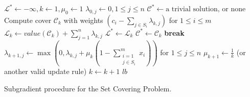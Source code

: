 \begin{enumerate}
    \begin{algorithm}[h]
    \begin{algorithmic}[1]
    \STATE $\mathcal{L}^\ast \gets -\infty, k \gets 1, \mu_0 \gets 1$
    \STATE $\lambda_{0,j} \gets 0, 1 \le j \le n$
    \STATE $\mathcal{C}^\ast \gets \text{a trivial solution, or none}$
        \STATE Compute cover $\mathcal{C}_k$ with weights $\left(c_i - \sum_{j \in S_i} \lambda_{k,j}\right)$ for $1 \le i \le m$
        \STATE $\mathcal{L}_k \gets value\left(\mathcal{C}_k\right) + \sum_{j=1}^n \lambda_{k,j}$
            \STATE $\mathcal{L}^\ast \gets \mathcal{L}_k$
        \ENDIF
            \STATE $\mathcal{C}^\ast \gets \mathcal{C}_k$
        \ENDIF
            \STATE \textbf{break}
        \ENDIF
        \STATE $\lambda_{k+1,j} \gets \max \left(0, \lambda_{k,j} + \mu_k \left(1 - \sum_{\substack{i=1\\j\in S_i}}^m x_i \right)\right)$ for $1 \le j \le n$
        \STATE $\mu_{k+1} \gets \frac{1}{k}$ (or another valid update rule)
        \STATE $k \gets k+1$
    \ENDWHILE
    \RETURN $lb$
    \end{algorithmic}
    \caption{Subgradient procedure for the Set Covering Problem.}
    \label{subgradient}
    \end{algorithm}
\end{enumerate}
